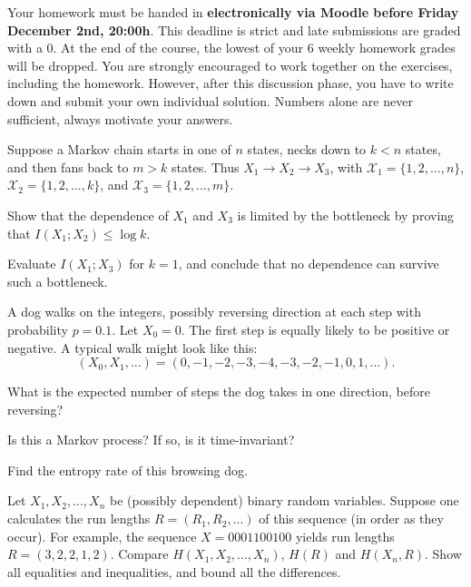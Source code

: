 \documentclass[a4paper,10pt,landscape,twocolumn]{scrartcl}
\newcommand\deadline{Friday December 2nd, 20:00h}
\begin{document}
\homeworkproblems

{\sffamily\noindent
Your homework must be handed in \textbf{electronically via Moodle before \deadline}. This deadline is strict and late submissions are graded with a 0. At the end of the course, the lowest of your 6 weekly homework grades will be dropped. You are strongly encouraged to work together on the exercises, including the homework. However, after this discussion phase, you have to write down and submit your own individual solution. Numbers alone are never sufficient, always motivate your answers.
}


\begin{exercise}[Bottleneck (4pt)]
Suppose a Markov chain starts in one of $n$ states, necks down to $k < n$ states, and then fans back to $m > k$ states. Thus $X_1 \to X_2 \to X_3$, with $\mathcal{X}_1 = \{1, 2, ..., n\}$, $\mathcal{X}_2 = \{1, 2, ..., k\}$, and $\mathcal{X}_3 = \{1, 2, ..., m\}$.
\begin{subex}[(3pt)]
Show that the dependence of $X_1$ and $X_3$ is limited by the bottleneck by proving that $I(X_1;X_2) \leq \log k$.
\end{subex}
\begin{subex}[(1pt)]
Evaluate $I(X_1;X_3)$ for $k = 1$, and conclude that no dependence can survive such a bottleneck.
\end{subex}
\end{exercise}






\begin{exercise}
A dog walks on the integers, possibly reversing direction at each step with probability $p = 0.1$. Let $X_0 = 0$. The first step is equally likely to be positive or negative. A typical walk might look like this:
\[
(X_0, X_1, ...) = (0, -1, -2, -3, -4, -3, -2, -1, 0, 1, ...).
\]
	\begin{subex}[(2pt)]
	What is the expected number of steps the dog takes in one direction, before reversing?
	\end{subex}
	\begin{subex}[(1pt)]
	Is this a Markov process? If so, is it time-invariant?
	\end{subex}
	\begin{subex}[(3pt)]
	Find the entropy rate of this browsing dog.
	\end{subex}
\end{exercise}

\begin{exercise}
Let $X_1, X_2, ..., X_n$ be (possibly dependent) binary random variables.
Suppose one calculates the run lengths $R = (R_1, R_2, ...)$ of this sequence (in order as they occur).
For example, the sequence $X = 0001100100$ yields run lengths $R = (3, 2, 2, 1, 2)$. Compare
$H(X_1, X_2, . . . , X_n)$, $H(R)$ and $H(X_n, R)$. Show all equalities and inequalities, and bound all the
differences.
\end{exercise}
\end{document}

